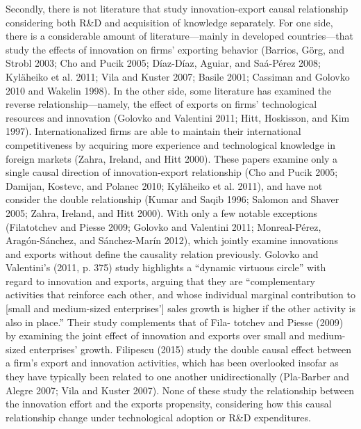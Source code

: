 Secondly, there is not literature that study innovation-export causal relationship considering both R\&D and acquisition of knowledge separately. For one side, there is a considerable amount of literature—mainly in developed countries—that study the effects of innovation on firms’ exporting behavior (Barrios, Görg, and Strobl 2003; Cho and Pucik 2005; Díaz-Díaz, Aguiar, and Saá-Pérez 2008; Kyläheiko et al. 2011; Vila and Kuster 2007; Basile 2001; Cassiman and Golovko 2010 and Wakelin 1998). In the other side, some literature has examined the reverse relationship—namely, the effect of exports on firms’ technological resources and innovation (Golovko and Valentini 2011; Hitt, Hoskisson, and Kim 1997). Internationalized firms are able to maintain their international competitiveness by acquiring more experience and technological knowledge in foreign markets (Zahra, Ireland, and Hitt 2000). These papers examine only a single causal direction of innovation-export relationship (Cho and Pucik 2005; Damijan, Kostevc, and Polanec 2010; Kyläheiko et al. 2011), and have not consider the double relationship (Kumar and Saqib 1996; Salomon and Shaver 2005; Zahra, Ireland, and Hitt 2000). With only a few notable exceptions (Filatotchev and Piesse 2009; Golovko and Valentini 2011; Monreal-Pérez, Aragón-Sánchez, and Sánchez-Marín 2012), which jointly examine innovations and exports without define the causality relation previously. Golovko and Valentini’s (2011, p. 375) study highlights a “dynamic virtuous circle” with regard to innovation and exports, arguing that they are “complementary activities that reinforce each other, and whose individual marginal contribution to [small and medium-sized enterprises’] sales growth is higher if the other activity is also in place.” Their study complements that of Fila- totchev and Piesse (2009) by examining the joint effect of innovation and exports over small and medium-sized enterprises’ growth. 
Filipescu (2015) study the double causal effect between a firm’s export and innovation activities, which has been overlooked insofar as they have typically been related to one another unidirectionally (Pla-Barber and Alegre 2007; Vila and Kuster 2007).
None of these study the relationship between the innovation effort and the exports propensity, considering how this causal relationship change under technological adoption or R\&D expenditures.
